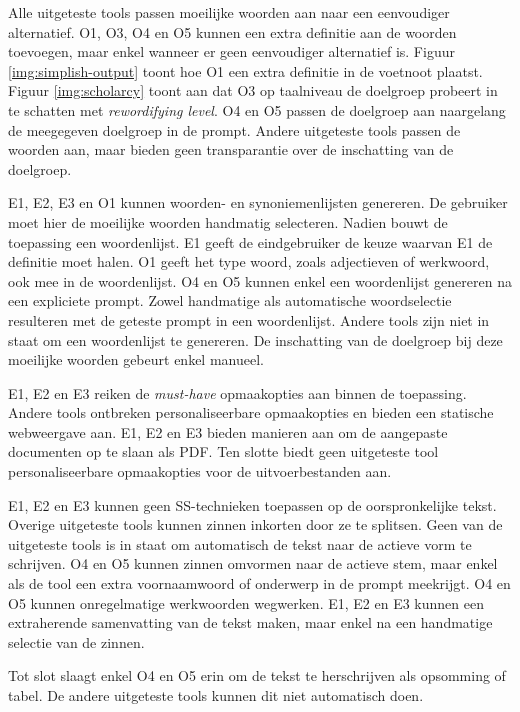 Alle uitgeteste tools passen moeilijke woorden aan naar een eenvoudiger alternatief. O1, O3, O4 en O5 kunnen een extra definitie aan de woorden toevoegen, maar enkel wanneer er geen eenvoudiger alternatief is. Figuur \ref{img:simplish-output} toont hoe O1 een extra definitie in de voetnoot plaatst. Figuur \ref{img:scholarcy} toont aan dat O3 op taalniveau de doelgroep probeert in te schatten met \textit{rewordifying level}. O4 en O5 passen de doelgroep aan naargelang de meegegeven doelgroep in de prompt. Andere uitgeteste tools passen de woorden aan, maar bieden geen transparantie over de inschatting van de doelgroep.

\medspace

E1, E2, E3 en O1 kunnen woorden- en synoniemenlijsten genereren. De gebruiker moet hier de moeilijke woorden handmatig selecteren. Nadien bouwt de toepassing een woordenlijst. E1 geeft de eindgebruiker de keuze waarvan E1 de definitie moet halen. O1 geeft het type woord, zoals adjectieven of werkwoord, ook mee in de woordenlijst. O4 en O5 kunnen enkel een woordenlijst genereren na een expliciete prompt. Zowel handmatige als automatische woordselectie resulteren met de geteste prompt in een woordenlijst. Andere tools zijn niet in staat om een woordenlijst te genereren. De inschatting van de doelgroep bij deze moeilijke woorden gebeurt enkel manueel.

\medspace

E1, E2 en E3 reiken de \textit{must-have} opmaakopties aan binnen de toepassing. Andere tools ontbreken personaliseerbare opmaakopties en bieden een statische webweergave aan. E1, E2 en E3 bieden manieren aan om de aangepaste documenten op te slaan als PDF. Ten slotte biedt geen uitgeteste tool personaliseerbare opmaakopties voor de uitvoerbestanden aan. 

E1, E2 en E3 kunnen geen SS-technieken toepassen op de oorspronkelijke tekst. Overige uitgeteste tools kunnen zinnen inkorten door ze te splitsen. Geen van de uitgeteste tools is in staat om automatisch de tekst naar de actieve vorm te schrijven. O4 en O5 kunnen zinnen omvormen naar de actieve stem, maar enkel als de tool een extra voornaamwoord of onderwerp in de prompt meekrijgt. O4 en O5 kunnen onregelmatige werkwoorden wegwerken. E1, E2 en E3 kunnen een extraherende samenvatting van de tekst maken, maar enkel na een handmatige selectie van de zinnen. 

\medspace

Tot slot slaagt enkel O4 en O5 erin om de tekst te herschrijven als opsomming of tabel. De andere uitgeteste tools kunnen dit niet automatisch doen.

